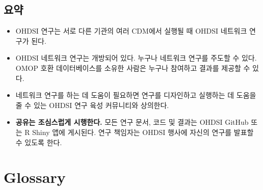 \documentclass[10.5pt]{book}
\providecommand{\tightlist}{%
  \setlength{\itemsep}{0pt}\setlength{\parskip}{0pt}}
\theoremstyle{definition}
\theoremstyle{definition}
\theoremstyle{definition}
\theoremstyle{remark}
\let\BeginKnitrBlock\begin \let\EndKnitrBlock\end
\begin{document}
\section{요약}\label{-18}

\BeginKnitrBlock{rmdsummary}
\begin{itemize}
\tightlist
\item
  OHDSI 연구는 서로 다른 기관의 여러 CDM에서 실행될 때 OHDSI 네트워크
  연구가 된다.
\item
  OHDSI 네트워크 연구는 개방되어 있다. 누구나 네트워크 연구를 주도할 수
  있다. OMOP 호환 데이터베이스를 소유한 사람은 누구나 참여하고 결과를
  제공할 수 있다.
\item
  네트워크 연구를 하는 데 도움이 필요하면 연구를 디자인하고 실행하는 데
  도움을 줄 수 있는 OHDSI 연구 육성 커뮤니티와 상의한다.
\item
  \textbf{공유는 조심스럽게 시행한다.} 모든 연구 문서, 코드 및 결과는
  OHDSI GitHub 또는 R Shiny 앱에 게시된다. 연구 책임자는 OHDSI 행사에
  자신의 연구를 발표할 수 있도록 한다.
\end{itemize}
\EndKnitrBlock{rmdsummary}

\appendix {}


\chapter{Glossary}\label{Glossary}
\end{document}
